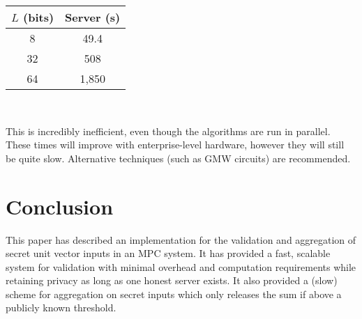 \documentclass[conference]{IEEEtran}
\begin{document}
\begin{center}
\begin{tabular}{|c|c|}
\hline
$L$ (bits) & Server (s)\\
\hline
8 & 49.4\\
32 & 508\\
64 & 1,850\\
\hline
\end{tabular}\\
\end{center}
\hfill\newline

This is incredibly inefficient, even though the algorithms are run in parallel. These times will improve with enterprise-level hardware, however they will still be quite slow. Alternative techniques (such as GMW circuits) are recommended.\\


\section{Conclusion}
This paper has described an implementation for the validation and aggregation of secret unit vector inputs in an MPC system. It has provided a fast, scalable system for validation with minimal overhead and computation requirements while retaining privacy as long as one honest server exists. It also provided a (slow) scheme for aggregation on secret inputs which only releases the sum if above a publicly known threshold. 





\nocite{*}
{}

\end{document}
